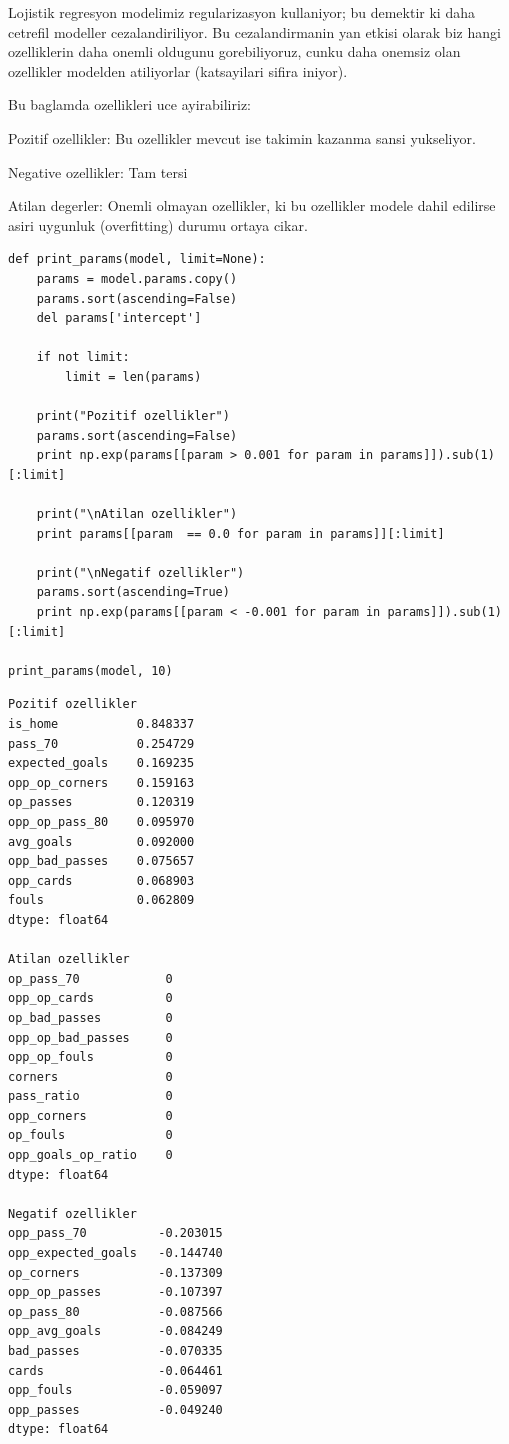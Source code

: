 \documentclass[12pt,fleqn]{article}\usepackage{../common}
\begin{document}
Lojistik regresyon modelimiz regularizasyon kullaniyor; bu demektir ki daha
cetrefil modeller cezalandiriliyor. Bu cezalandirmanin yan etkisi olarak
biz hangi ozelliklerin daha onemli oldugunu gorebiliyoruz, cunku daha
onemsiz olan ozellikler modelden atiliyorlar (katsayilari sifira iniyor). 

Bu baglamda ozellikleri uce ayirabiliriz:

Pozitif ozellikler: Bu ozellikler mevcut ise takimin kazanma sansi yukseliyor.

Negative ozellikler: Tam tersi

Atilan degerler: Onemli olmayan ozellikler, ki bu ozellikler modele dahil
edilirse asiri uygunluk (overfitting) durumu ortaya cikar. 

\begin{verbatim}
def print_params(model, limit=None):    
    params = model.params.copy()
    params.sort(ascending=False)
    del params['intercept']
    
    if not limit:
        limit = len(params)

    print("Pozitif ozellikler")
    params.sort(ascending=False)
    print np.exp(params[[param > 0.001 for param in params]]).sub(1)[:limit]

    print("\nAtilan ozellikler")
    print params[[param  == 0.0 for param in params]][:limit]

    print("\nNegatif ozellikler")
    params.sort(ascending=True)
    print np.exp(params[[param < -0.001 for param in params]]).sub(1)[:limit]

print_params(model, 10)
\end{verbatim}

\begin{verbatim}
Pozitif ozellikler
is_home           0.848337
pass_70           0.254729
expected_goals    0.169235
opp_op_corners    0.159163
op_passes         0.120319
opp_op_pass_80    0.095970
avg_goals         0.092000
opp_bad_passes    0.075657
opp_cards         0.068903
fouls             0.062809
dtype: float64

Atilan ozellikler
op_pass_70            0
opp_op_cards          0
op_bad_passes         0
opp_op_bad_passes     0
opp_op_fouls          0
corners               0
pass_ratio            0
opp_corners           0
op_fouls              0
opp_goals_op_ratio    0
dtype: float64

Negatif ozellikler
opp_pass_70          -0.203015
opp_expected_goals   -0.144740
op_corners           -0.137309
opp_op_passes        -0.107397
op_pass_80           -0.087566
opp_avg_goals        -0.084249
bad_passes           -0.070335
cards                -0.064461
opp_fouls            -0.059097
opp_passes           -0.049240
dtype: float64
\end{verbatim}
\end{document}
